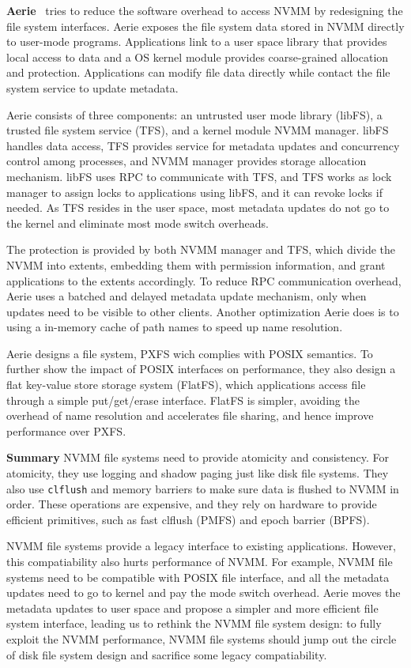 
\textbf{Aerie}~\cite{Aerie} tries to reduce the software overhead to access NVMM
by redesigning the file system interfaces. Aerie exposes the file system
data stored in NVMM directly to user-mode programs. Applications link to
a user space library that provides local access to data and a OS kernel
module provides coarse-grained allocation and protection. Applications can
modify file data directly while contact the file system service to update
metadata.

Aerie consists of three components: an untrusted user mode library (libFS),
a trusted file system service (TFS), and a kernel module NVMM manager. libFS
handles data access, TFS provides service for metadata updates and concurrency
control among processes, and NVMM manager provides storage allocation mechanism.
libFS uses RPC to communicate with TFS, and TFS works as lock manager to 
assign locks to applications using libFS, and it can revoke locks if needed.
As TFS resides in the user space, most metadata updates do not go to the kernel
and eliminate most mode switch overheads.

The protection is provided by both NVMM manager and TFS, which divide the NVMM
into extents, embedding them with permission information, and grant applications
to the extents accordingly. To reduce RPC communication overhead, Aerie
uses a batched and delayed metadata update mechanism, only when updates need to
be visible to other clients. Another optimization Aerie does is to using
a in-memory cache of path names to speed up name resolution.

Aerie designs a file system, PXFS wich complies with POSIX semantics.
To further show the impact of POSIX interfaces on performance, they also design 
a flat key-value store storage system (FlatFS), which applications access file
through a simple put/get/erase interface. FlatFS is simpler, avoiding the
overhead of name resolution and accelerates file sharing, and hence improve
performance over PXFS.

\textbf{Summary} NVMM file systems need to provide atomicity and consistency.
For atomicity, they use logging and shadow paging just like disk file systems.
They also use \texttt{clflush} and memory barriers to make sure data is
flushed to NVMM in order. These operations are expensive, and they rely
on hardware to provide efficient primitives, such as fast clflush (PMFS) and
epoch barrier (BPFS).

NVMM file systems provide a legacy interface to existing applications. However,
this compatiability also hurts performance of NVMM. For example, NVMM
file systems need to be compatible with POSIX file interface, and all the
metadata updates need to go to kernel and pay the mode switch overhead.
Aerie moves the metadata updates to user space and propose a simpler and more
efficient file system interface, leading us to rethink the NVMM
file system design: to fully exploit the NVMM performance, NVMM file systems
should jump out the circle of disk file system design and sacrifice some
legacy compatiability.
